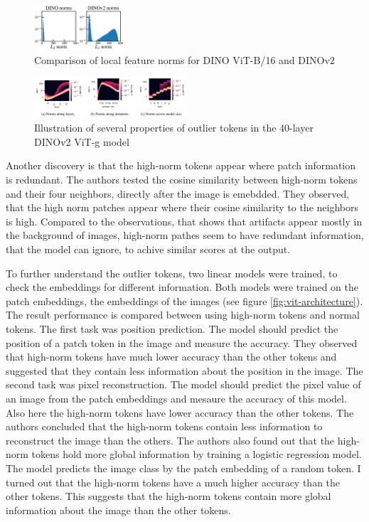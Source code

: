 \documentclass[conference]{IEEEtran}
\begin{document}
  \begin{figure}
    \centering
    \includegraphics[width=0.3\textwidth]{figures/artifact-norm.png}
    \caption{Comparison of local feature norms for DINO ViT-B/16 and DINOv2 \cite{registers}}
    \label{fig:artifacts-norm}
  \end{figure}
  \begin{figure}
    \centering
    \includegraphics[width=0.5\textwidth]{figures/artifact-layers.png}
    \caption{Illustration of several properties of outlier tokens in the 40-layer DINOv2 ViT-g model \cite{registers}}
    \label{fig:artifacts-layer}
  \end{figure}

  Another discovery is that the high-norm tokens appear where patch information is redundant. The authors tested the cosine similarity between high-norm tokens and their four neighbors, directly after the image is emebdded. They observed, that the high norm patches appear where their cosine similarity to the neighbors is high. Compared to the observations, that shows that artifacts appear mostly in the background of images, high-norm pathes seem to have redundant information, that the model can ignore, to achive similar scores at the output.

  To further understand the outlier tokens, two linear models were trained, to check the embeddings for different information. Both models were trained on the patch embeddings, the embeddings of the images (see figure \ref{fig:vit-architecture}). The result performance is compared between using high-norm tokens and normal tokens. The first task was position prediction. The model should predict the position of a patch token in the image and measure the accuracy. They observed that high-norm tokens have much lower accuracy than the other tokens and suggested that they contain less information about the position in the image. The second task was pixel reconstruction. The model should predict the pixel value of an image from the patch embeddings and mesaure the accuracy of this model. Also here the high-norm tokens have  lower accuracy than the other tokens. The authors concluded that the high-norm tokens contain less information to reconstruct the image than the others. 
  The authors also found out that the high-norm tokens hold more global information by training a logistic regression model. The model predicts the image class by the patch embedding of a random token. I turned out that the high-norm tokens have a much higher accuracy than the other tokens. This suggests that the high-norm tokens contain more global information about the image than the other tokens. 
\end{document}
